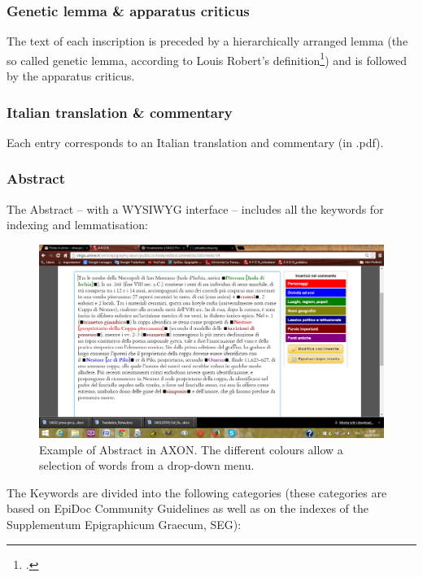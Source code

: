 \documentclass[amsthm,ebook]{saparticle}
\begin{document}
\subsubsection{Genetic lemma \& apparatus criticus}


\noindent The text of each inscription is preceded by a hierarchically arranged lemma (the so called genetic lemma, according to
Louis Robert’s definition\footnote{\citet{robert_carie:_1954}.}) and is followed by the apparatus criticus.




\subsubsection{Italian translation \& commentary}


\noindent Each entry corresponds to an Italian translation and commentary (in .pdf). 




\subsubsection{Abstract}


\noindent The Abstract – with a WYSIWYG interface – includes all the keywords for indexing and lemmatisation:

\begin{figure}[!bp]
\centering
 \includegraphics[width=\columnwidth]{EAGLE2016FullPaperrevised-img002.png}
\caption{Example of Abstract in AXON. The different colours allow a selection of words from a drop-down menu. }
\label{fig:2}
\end{figure}




The Keywords are divided into the following categories (these categories are based on EpiDoc Community Guidelines as
well as on the indexes of the Supplementum Epigraphicum Graecum, SEG):
\end{document}
